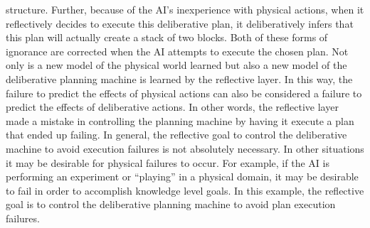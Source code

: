 structure.  Further, because of the AI's inexperience with physical
actions, when it reflectively decides to execute this deliberative
plan, it deliberatively infers that this plan will actually create a
stack of two blocks.  Both of these forms of ignorance are corrected
when the AI attempts to execute the chosen plan.  Not only is a new
model of the physical world learned but also a new model of the
deliberative planning machine is learned by the reflective layer.  In
this way, the failure to predict the effects of physical actions can
also be considered a failure to predict the effects of deliberative
actions.  In other words, the reflective layer made a mistake in
controlling the planning machine by having it execute a plan that
ended up failing.  In general, the reflective goal to control the
deliberative machine to avoid execution failures is not absolutely
necessary.  In other situations it may be desirable for physical
failures to occur.  For example, if the AI is performing an experiment
or ``playing'' in a physical domain, it may be desirable to fail in
order to accomplish knowledge level goals.  In this example, the
reflective goal is to control the deliberative planning machine to
avoid plan execution failures.
